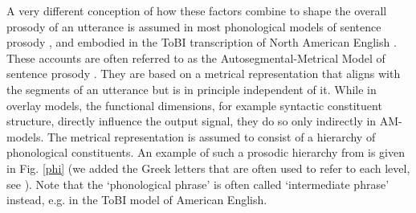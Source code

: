 \documentclass[preprint,review,12pt,authoryear,times]{elsarticle}
\begin{document}
A very different conception of how these factors combine to shape the overall prosody of an utterance is assumed in most phonological models of sentence prosody \citep[e.g.][]{pierr80,ladd80,selki84}, and embodied in the ToBI transcription of North American English \citep{beckm97,beckm05}. These accounts are often referred to as the Autosegmental-Metrical Model of sentence prosody  \citep[`AM-Model', cf.][]{ladd08}. They are based on a metrical representation that aligns with the segments of an utterance but is in principle independent of it. While in overlay models, the functional dimensions, for example syntactic constituent structure, directly influence the output signal, they do so only indirectly in AM-models. The metrical representation is assumed to consist of a hierarchy of phonological constituents. An example of such a  prosodic hierarchy from  \citet[384]{selki86} is given in Fig. \ref{phi} (we added the Greek letters that are often used to refer to each level, see \citealt{fery13}). Note that the `phonological phrase' is often called `intermediate phrase' instead, e.g. in the ToBI model of American English.
\end{document}

